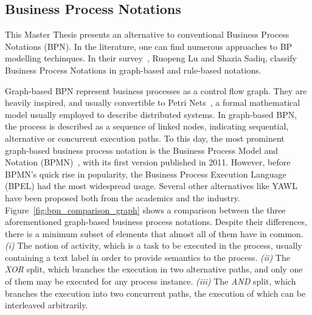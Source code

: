 \subsection{Business Process Notations}




This Master Thesis presents an alternative to conventional Business Process
Notations (BPN). In the literature, one can find numerous approaches to BP modelling
techinques. In their survey~\cite{10.1007/978-3-540-72035-5_7}, Ruopeng Lu and
Shazia Sadiq, classify Business Process Notations in graph-based and rule-based notations.

Graph-based BPN represent business processes as a control flow graph. They are
heavily inspired, and usually convertible to Petri Nets~\cite{lohmann2009petri},
a formal mathematical model usually employed to describe distributed systems. In
graph-based BPN, the process is described as a sequence of linked nodes,
indicating sequential, alternative or concurrent execution paths. To this day,
the most prominent graph-based business process notation is the Business Process
Model and Notation (BPMN)~\cite{chinosi2012bpmn}, with its first version
published in 2011. However, before BPMN's quick rise in popularity, the Business
Process Execution Language (BPEL) had the most widespread usage. Several other
alternatives like YAWL~\cite{van2005yawl} have been proposed both from the
academics and the industry. Figure~\ref{fig:bpn_comparison_graph} shows a
comparison between the three aforementioned graph-based business process
notations. Despite their differences, there is a minimum subset of elements that
almost all of them have in common. \textit{(i)} The notion of activity, which is
a task to be executed in the process, usually containing a text label in order
to provide semantics to the process. \textit{(ii)} The \emph{XOR} split, which
branches the execution in two alternative paths, and only one of them may be
executed for any process instance. \textit{(iii)} The \emph{AND} split, which
branches the execution into two concurrent paths, the execution of which can be
interleaved arbitrarily.

